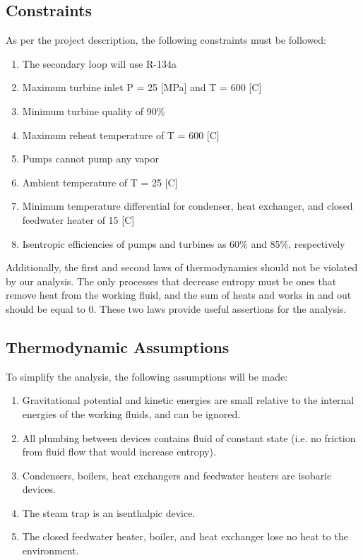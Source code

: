 \documentclass[10pt,cleanfoot]{asme2ej}
\begin{document}
\subsection{Constraints}

As per the project description, the following constraints must be followed:

\begin{enumerate}
\item
The secondary loop will use R-134a
\item
Maximum turbine inlet P = 25 [MPa] and T = 600 [C]
\item
Minimum turbine quality of 90\%
\item
Maximum reheat temperature of T = 600 [C]
\item
Pumps cannot pump any vapor
\item
Ambient temperature of T = 25 [C]
\item
Minimum temperature differential for condenser, heat exchanger, and closed feedwater heater of 15 [C]
\item
Isentropic efficiencies of pumps and turbines as 60\% and 85\%, respectively
\end{enumerate}

Additionally, the first and second laws of thermodynamics should not be violated by our analysis. The only processes that decrease entropy must be ones that remove heat from the working fluid, and the sum of heats and works in and out should be equal to 0. These two laws provide useful assertions for the analysis.

\subsection{Thermodynamic Assumptions}

To simplify the analysis, the following assumptions will be made:
\begin{enumerate}
\item
Gravitational potential and kinetic energies are small relative to the internal energies of the working fluids, and can be ignored.
\item
All plumbing between devices contains fluid of constant state (i.e. no friction from fluid flow that would increase entropy).
\item
Condensers, boilers, heat exchangers and feedwater heaters are isobaric devices.
\item
The steam trap is an isenthalpic device.
\item
The closed feedwater heater, boiler, and heat exchanger lose no heat to the environment.
\end{enumerate}
\end{document}
